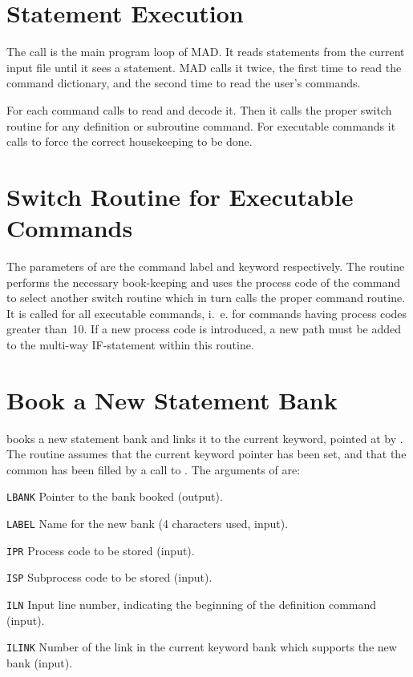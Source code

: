 \section{Statement Execution}
\label{AAMAIN}
The call
is the main program loop of MAD.
It reads statements from the current input file until it sees a
 statement.
MAD calls it twice,
the first time to read the command dictionary,
and the second time to read the user's commands.

For each command  calls  to read and
decode it.
Then it calls the proper switch routine for any definition or
subroutine command.
For executable commands it calls  to force the correct
housekeeping to be done.

\section{Switch Routine for Executable Commands}
\label{AAEXEC}
The parameters of  are the command label and keyword
respectively.
The routine performs the necessary book-keeping and uses the process
code of the command to select another switch routine which in turn
calls the proper command routine.
It is called for all executable commands,
i.~e. for commands having process codes greater than~10.
If a new process code is introduced,
a new path must be added to the multi-way IF-statement within this
routine.

\section{Book a New Statement Bank}
\label{AABOOK}
books a new statement bank and links it to the current keyword,
pointed at by .
The routine assumes that the current keyword pointer 
has been set,
and that the  common has been filled by a call to
.
The arguments of  are:
\begin{mylist}
\item[\tt LBANK]
Pointer to the bank booked (output).
\item[\tt LABEL]
Name for the new bank (4 characters used, input).
\item[\tt IPR]
Process code to be stored (input).
\item[\tt ISP]
Subprocess code to be stored (input).
\item[\tt ILN]
Input line number, indicating the beginning of the definition
command (input).
\item[\tt ILINK]
Number of the link in the current keyword bank which supports
the new bank (input).
\end{mylist}

